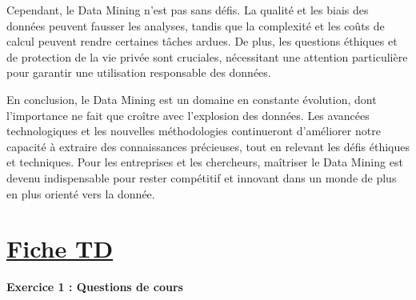 \documentclass[a4paper,14pt]{article}
\begin{document}
Cependant, le Data Mining n'est pas sans défis. La qualité et les biais des données peuvent fausser les analyses, tandis que la complexité et les coûts de calcul peuvent rendre certaines tâches ardues. De plus, les questions éthiques et de protection de la vie privée sont cruciales, nécessitant une attention particulière pour garantir une utilisation responsable des données.

En conclusion, le Data Mining est un domaine en constante évolution, dont l'importance ne fait que croître avec l'explosion des données. Les avancées technologiques et les nouvelles méthodologies continueront d'améliorer notre capacité à extraire des connaissances précieuses, tout en relevant les défis éthiques et techniques. Pour les entreprises et les chercheurs, maîtriser le Data Mining est devenu indispensable pour rester compétitif et innovant dans un monde de plus en plus orienté vers la donnée.
\nocite{*} 

 \newpage
     
    \section*{\centering \underline{\textbf{\huge Fiche TD}}}
    \vspace{1cm}
    
    \textbf{Exercice 1 : Questions de cours} \\
    
\end{document}
